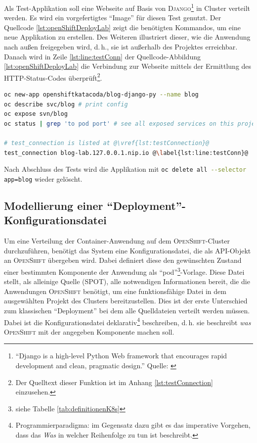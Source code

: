 \par
Als Test-Applikation soll eine Webseite auf Basis von \textsc{Django}\footnote{\enquote{Django is a high-level Python Web framework that encourages rapid development and clean, pragmatic design.} Quelle: \cite[][]{django_software_foundation_web_2020}} in Cluster verteilt werden. Es wird ein vorgefertigtes \enquote{Image} für diesen Test genutzt. Der Quellcode \vref{lst:openShiftDeployLab} zeigt die benötigten Kommandos, um eine neue Applikation zu erstellen. Des Weiteren illustriert dieser, wie die Anwendung nach außen freigegeben wird, d.\,h., sie ist außerhalb des Projektes erreichbar. Danach wird in Zeile \vref{lst:line:testConn} der Quellcode-Abbildung \vref{lst:openShiftDeployLab} die Verbindung zur Webseite mittels der Ermittlung des \textsc{HTTP}-Status-Codes überprüft\footnote{Der Quelltext dieser Funktion ist im Anhang \vref{lst:testConnection} einzusehen.}.

\begin{lstlisting}[language=bash, caption={Test-\enquote{Deployment} ins \textsc{OpenShift}-Cluster}, label={lst:openShiftDeployLab}]
oc new-app openshiftkatacoda/blog-django-py --name blog
oc describe svc/blog # print config 
oc expose svn/blog
oc status | grep 'to pod port' # see all exposed services on this project

# test_connection is listed at @\vref{lst:testConnection}@
test_connection blog-lab.127.0.0.1.nip.io @\label{lst:line:testConn}@
\end{lstlisting}

Nach Abschluss des Tests wird die Applikation mit \lstinline[language=bash]|oc delete all --selector app=blog| wieder gelöscht.

\subsection{Modellierung einer \enquote{Deployment}-Konfigurationsdatei}
Um eine Verteilung der Container-Anwendung auf dem \textsc{OpenShift}-Cluster durchzuführen, benötigt das System eine Konfigurationsdatei, die als \ac{API}-Objekt an \textsc{OpenShift} übergeben wird. Dabei definiert diese den gewünschten Zustand einer bestimmten Komponente der Anwendung als \enquote{pod}\footnote{siehe Tabelle \vref{tab:definitionenK8s}}-Vorlage.\autocite[vgl.][Application\,$\rightarrow$\,Deployments]{red_hat_inc_okd_2019} Diese Datei stellt, als alleinige Quelle (\ac{SPOT}), alle notwendigen Informationen bereit, die die Anwendungen \textsc{OpenShift} benötigt, um eine funktionsfähige Datei in dem ausgewählten Projekt des Clusters bereitzustellen. Dies ist der erste Unterschied zum klassischen \enquote{Deployment} bei dem alle Quelldateien verteilt werden müssen.\autocite[vgl.][]{dearle_software_2007} Dabei ist die Konfigurationsdatei deklarativ\footnote{Programmierparadigma: im Gegensatz dazu gibt es das imperative Vorgehen, dass das \textit{Was} in welcher Reihenfolge zu tun ist beschreibt.} beschreiben, d.\,h. sie beschreibt \textit{was} \textsc{OpenShift} mit der angegeben Komponente machen soll.

